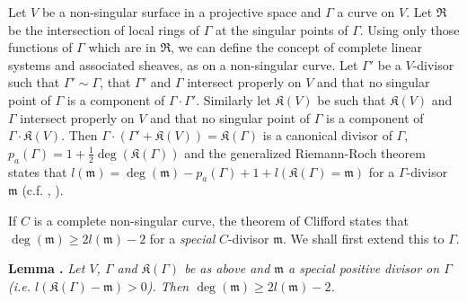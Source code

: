 Let $V$ be a non-singular surface in a projective space and $\Gamma$ a curve on $V$. Let $\mathfrak{R}$ be the intersection of local rings of $\Gamma$ at the singular points of $\Gamma$. Using only those functions of $\Gamma$ which are in $\mathfrak{R}$, we can define the concept of complete linear systems and associated sheaves, as on a non-singular curve. Let $\Gamma'$ be a $V$-divisor such that $\Gamma'\sim \Gamma$, that $\Gamma'$ and $\Gamma$ intersect properly on $V$ and that no singular point of $\Gamma$ is a component of $\Gamma\cdot \Gamma'$. Similarly let $\mathfrak{K}(V)$ be such that $\mathfrak{K}(V)$ and $\Gamma$ intersect properly on $V$ and that no singular point of $\Gamma$ is a component of $\Gamma\cdot \mathfrak{K}(V)$. Then $\Gamma\cdot (\Gamma'+\mathfrak{K}(V))=\mathfrak{K}(\Gamma)$ is a canonical divisor of $\Gamma$, $p_{a}(\Gamma)=1+\frac{1}{2}\deg (\mathfrak{K}(\Gamma))$ and the generalized Riemann-Roch theorem states that $l(\mathfrak{m})=\deg (\mathfrak{m})-p_{a}(\Gamma)+1+l(\mathfrak{K}(\Gamma)=\mathfrak{m})$ for a $\Gamma$-divisor $\mathfrak{m}$ (c.f. \cite{art14-key20}, \cite{art14-key22}).

If $C$ is a complete non-singular curve, the theorem  of Clifford states that $\deg (\mathfrak{m})\geq 2l(\mathfrak{m})-2$ for a {\em special} $C$-divisor $\mathfrak{m}$. We shall first extend this to $\Gamma$.

\medskip
\noindent
{\bf Lemma .\label{art14-lem2}}
{\em Let $V$, $\Gamma$ and $\mathfrak{K}(\Gamma)$ be as above and $\mathfrak{m}$ a special positive divisor on $\Gamma$ (i.e. $l(\mathfrak{K}(\Gamma)-\mathfrak{m})>0$). Then $\deg (\mathfrak{m})\geq 2l(\mathfrak{m})-2$.}

